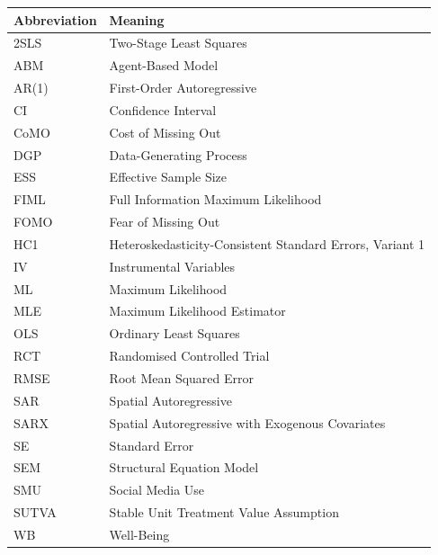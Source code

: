 \begin{tabular}{@{}l>{\raggedright\arraybackslash}p{}@{}}
\toprule
\textbf{Abbreviation} & \textbf{Meaning} \\
\midrule
2SLS & Two-Stage Least Squares \\
ABM & Agent-Based Model \\
AR(1) & First-Order Autoregressive \\
CI & Confidence Interval \\
CoMO & Cost of Missing Out \\
DGP & Data-Generating Process \\
ESS & Effective Sample Size \\
FIML & Full Information Maximum Likelihood \\
FOMO & Fear of Missing Out \\
HC1 & Heteroskedasticity-Consistent Standard Errors, Variant 1 \\
IV & Instrumental Variables \\
ML & Maximum Likelihood \\
MLE & Maximum Likelihood Estimator \\
OLS & Ordinary Least Squares \\
RCT & Randomised Controlled Trial \\
RMSE & Root Mean Squared Error \\
SAR & Spatial Autoregressive \\
SARX & Spatial Autoregressive with Exogenous Covariates \\
SE & Standard Error \\
SEM & Structural Equation Model \\
SMU & Social Media Use \\
SUTVA & Stable Unit Treatment Value Assumption \\
WB & Well-Being \\
\bottomrule
\end{tabular}
